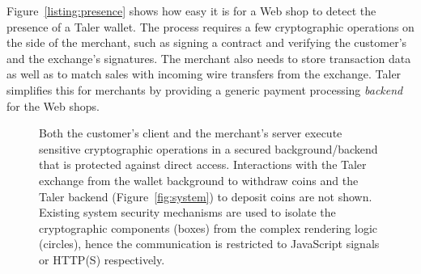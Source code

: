 \documentclass{IEEEtran}
\begin{document}
Figure~\ref{listing:presence} shows how easy it is for a Web shop to
detect the presence of a Taler wallet.  The process requires a few
cryptographic operations on the side of the merchant, such as signing
a contract and verifying the customer's and the exchange's signatures.
The merchant also needs to store transaction data as well as to match
sales with incoming wire transfers from the exchange.  Taler
simplifies this for merchants by providing a generic payment
processing {\em backend} for the Web shops.

\begin{figure}[h!]
\begin{center}
\end{center}
 \caption{Both the customer's client and the merchant's server
          execute sensitive cryptographic operations in a
          secured background/backend that is protected against direct access.
          Interactions with the Taler exchange from the wallet background
          to withdraw coins and the Taler backend (Figure~\ref{fig:system})
          to deposit coins are not shown.
          Existing system security mechanisms
          are used to isolate the cryptographic components (boxes) from
          the complex rendering logic (circles), hence the communication
          is restricted to JavaScript signals or HTTP(S) respectively.}
 \label{fig:frobearch}
\end{figure}
\end{document}
